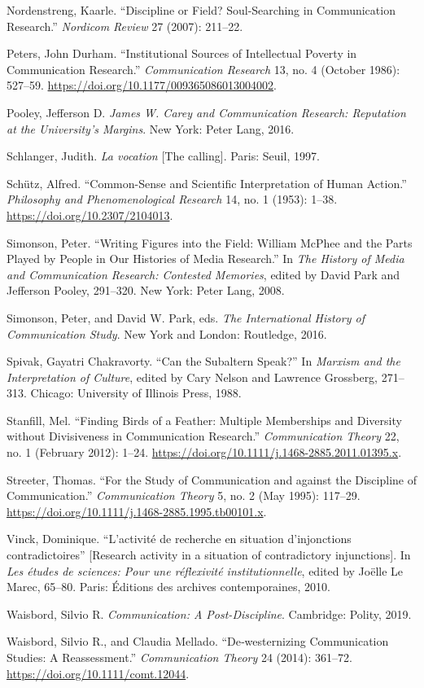 \documentclass{tufte-handout}
\begin{document}
\begin{hangparas}{.25in}{1}
Nordenstreng, Kaarle. ``Discipline or Field? Soul-Searching in
Communication Research.'' \emph{Nordicom Review} 27 (2007): 211--22.

Peters, John Durham. ``Institutional Sources of Intellectual Poverty in
Communication Research.'' \emph{Communication Research} 13, no. 4
(October 1986): 527--59.
\url{https://doi.org/10.1177/009365086013004002}.

Pooley, Jefferson D. \emph{James W. Carey and Communication Research:
Reputation at the University's Margins}. New York: Peter Lang, 2016.

Schlanger, Judith. \emph{La vocation} {[}The calling{]}. Paris: Seuil,
1997.

Schütz, Alfred. ``Common-Sense and Scientific Interpretation of Human
Action.'' \emph{Philosophy and Phenomenological Research} 14, no. 1
(1953): 1--38. \url{https://doi.org/10.2307/2104013}.

Simonson, Peter. ``Writing Figures into the Field: William McPhee and
the Parts Played by People in Our Histories of Media Research.'' In
\emph{The History of Media and Communication Research: Contested
Memories}, edited by David Park and Jefferson Pooley, 291--320. New
York: Peter Lang, 2008.

Simonson, Peter, and David W. Park, eds. \emph{The International History
of Communication Study}. New York and London: Routledge, 2016.

Spivak, Gayatri Chakravorty. ``Can the Subaltern Speak?'' In
\emph{Marxism and the Interpretation of Culture}, edited by Cary Nelson
and Lawrence Grossberg, 271--313. Chicago: University of Illinois Press,
1988.

Stanfill, Mel. ``Finding Birds of a Feather: Multiple Memberships and
Diversity without Divisiveness in Communication Research.''
\emph{Communication Theory} 22, no. 1 (February 2012): 1--24.
\url{https://doi.org/10.1111/j.1468-2885.2011.01395.x}.

Streeter, Thomas. ``For the Study of Communication and against the
Discipline of Communication.'' \emph{Communication Theory} 5, no. 2 (May
1995): 117--29.
\url{https://doi.org/10.1111/j.1468-2885.1995.tb00101.x}.

Vinck, Dominique. ``L'activité de recherche en situation d'injonctions
contradictoires'' {[}Research activity in a situation of contradictory
injunctions{]}. In \emph{Les études de sciences: Pour une réflexivité
institutionnelle}, edited by Joëlle Le Marec, 65--80. Paris: Éditions
des archives contemporaines, 2010.

Waisbord, Silvio R. \emph{Communication: A Post-Discipline}. Cambridge:
Polity, 2019.

Waisbord, Silvio R., and Claudia Mellado. ``De‐westernizing
Communication Studies: A Reassessment.'' \emph{Communication Theory} 24
(2014): 361--72. \url{https://doi.org/10.1111/comt.12044}.



\end{hangparas}
\end{document}
